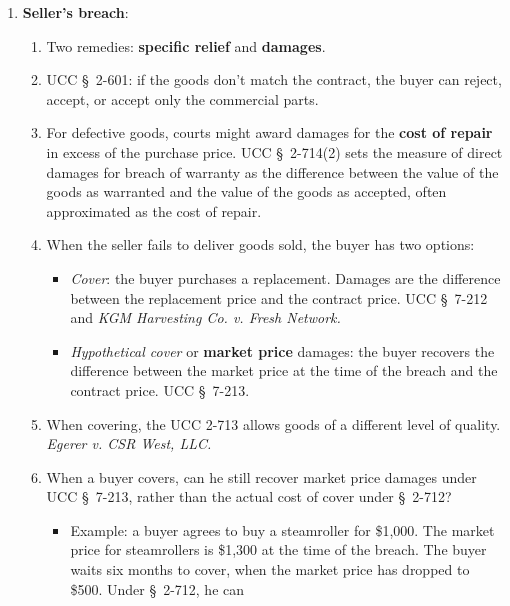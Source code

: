 \begin{enumerate}
\begin{enumerate}
        \item \textbf{Seller's breach}:
        \begin{enumerate}
            \item Two remedies: \textbf{specific relief} and \textbf{damages}.
            \item UCC \S\ 2-601: if the goods don't match the contract, the 
            buyer can reject, accept, or accept only the commercial parts.
            \item For defective goods, courts might award damages for the 
            \textbf{cost of repair} in excess of the purchase price.  UCC \S\ 
            2-714(2) sets the measure of direct damages for breach of warranty 
            as the difference between the value of the goods as warranted and 
            the value of the goods as accepted, often approximated as the cost 
            of repair.
            \item When the seller fails to deliver goods sold, the buyer has 
            two options:
            \begin{itemize}
                \item \emph{Cover}: the buyer purchases a replacement. Damages 
                are the difference between the replacement price and the 
                contract price. UCC \S\ 7-212 and \emph{KGM Harvesting Co. v. 
                Fresh Network.}
                \item \emph{Hypothetical cover} or \textbf{market price} 
                damages: the buyer recovers the difference between the market 
                price at the time of the breach and the contract price. UCC 
                \S\ 7-213.
            \end{itemize}
            \item When covering, the UCC 2-713 allows goods of a different 
            level of quality. \emph{Egerer v. CSR West, LLC.}
            \item When a buyer covers, can he still recover market price 
            damages under UCC \S\ 7-213, rather than the actual cost of cover 
            under \S\ 2-712?
            \begin{itemize}
                \item Example: a buyer agrees to buy a steamroller for 
                \$1,000. The market price for steamrollers is \$1,300 at the 
                time of the breach. The buyer waits six months to cover, when 
                the market price has dropped to \$500. Under \S\ 2-712, he can 

\end{itemize}
\end{enumerate}
\end{enumerate}
\end{enumerate}
